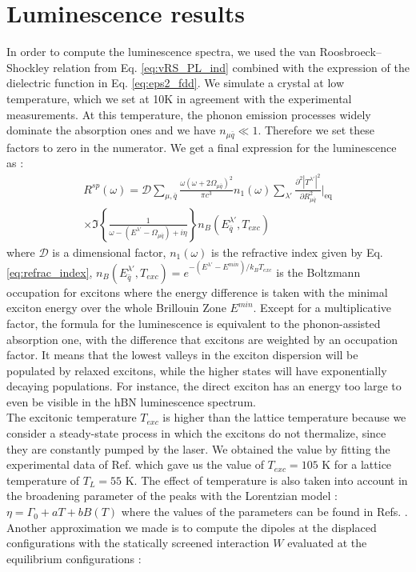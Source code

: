 %
\section{Luminescence results}
In order to compute the luminescence spectra, we used the van Roosbroeck--Shockley relation from Eq. \eqref{eq:vRS_PL_ind} combined with the expression of the dielectric function in Eq. \eqref{eq:eps2_fdd}. We simulate a crystal at low temperature, which we set at 10K in agreement with the experimental measurements. At this temperature, the phonon emission processes widely dominate the absorption ones and we have $n_{\mu \bar{q}} \ll  1$. Therefore we set these factors to zero in the numerator. We get a final expression for the luminescence as :
\begin{multline}
	R^{sp}(\omega)= \mathcal{D} \sum_{\mu,{\bar{q}}} \frac{\omega(\omega + 2\Omega_{\mu \bar{q}})^2}{\pi c^3 } n_1(\omega) \sum_{\lambda'} \frac{\partial^2 |T^{\lambda'}|^2 }{\partial R_{\mu\bar{q}}^2}\biggr|_{\text{eq}} \\ \times	\Im \left\{\frac{1}{\omega-(E^{\lambda'}-\Omega_{\mu \bar{q}})+i\eta}\right\} n_B(E^{\lambda'}_{\bar{q}},T_{exc}) \label{eq:strain_vRS_PL}
\end{multline}
where $\mathcal{D}$ is a dimensional factor, $n_1(\omega)$ is the refractive index given by Eq. \eqref{eq:refrac_index}, $n_B(E^{\lambda'}_{\bar{q}},T_{exc}) = e^{-(E^{\lambda'}-E^{min})/k_BT_{exc}}$ is the Boltzmann occupation for excitons where the energy difference is taken with the minimal exciton energy over the whole Brillouin Zone $E^{min}$. Except for a multiplicative factor, the formula for the luminescence is equivalent to the phonon-assisted absorption one, with the difference that excitons are weighted by an occupation factor. It means that the lowest valleys in the exciton dispersion will be populated by relaxed excitons, while the higher states will have exponentially decaying populations.
For instance, the direct exciton has an energy too large to even be visible in the \acrshort{hBN} luminescence spectrum.
\\
The excitonic temperature $T_{exc}$ is higher than the lattice temperature because we consider a steady-state process in which the excitons do not thermalize, since they are constantly pumped by the laser. We obtained the value by fitting the experimental data of Ref. \cite{cassabois2016hexagonal} which gave us the value of $T_{exc} = 105$ K for a lattice temperature of $T_L = 55$ K. The effect of temperature is also taken into account in the broadening parameter of the peaks with the Lorentzian model : $\eta = \Gamma_0 + aT + bB(T)$ where the values of the parameters can be found in Refs. \cite{paleari2019exciton,vuong2017exciton}. Another approximation we made is to compute the dipoles at the displaced configurations with the statically screened interaction $W$ evaluated at the equilibrium configurations : 
